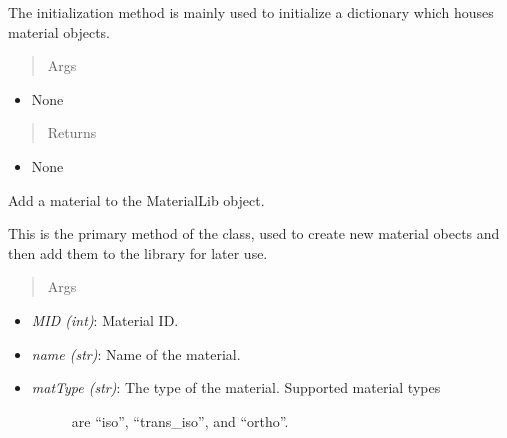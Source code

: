 \documentclass[letterpaper,10pt,english]{sphinxmanual}
\begin{document}
\begin{fulllineitems}
\begin{fulllineitems}
The initialization method is mainly used to initialize a dictionary
which houses material objects.
\begin{quote}\begin{description}
\item[{Args}] \leavevmode
\end{description}\end{quote}
\begin{itemize}
\item {} 
None

\end{itemize}
\begin{quote}\begin{description}
\item[{Returns}] \leavevmode
\end{description}\end{quote}
\begin{itemize}
\item {} 
None

\end{itemize}

\end{fulllineitems}


\begin{fulllineitems}
\label{structures:AeroComBAT.Structures.MaterialLib.addMat}
Add a material to the MaterialLib object.

This is the primary method of the class, used to create new material
obects and then add them to the library for later use.
\begin{quote}\begin{description}
\item[{Args}] \leavevmode
\end{description}\end{quote}
\begin{itemize}
\item {} 
\emph{MID (int)}: Material ID.

\item {} 
\emph{name (str)}: Name of the material.

\item {} \begin{description}
\item[{\emph{matType (str)}: The type of the material. Supported material types}] \leavevmode
are ``iso'', ``trans\_iso'', and ``ortho''.


\end{description}
\end{itemize}
\end{fulllineitems}
\end{fulllineitems}
\end{document}
